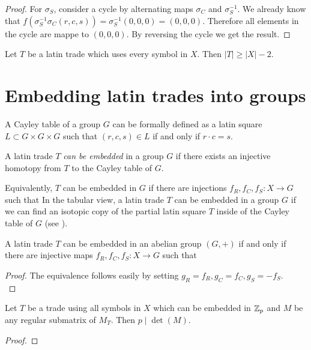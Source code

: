 \begin{proof}
For $\sigma_S$, consider a cycle by alternating maps $\sigma_C$ and $\sigma_S^{-1}$. We already know that $f(\sigma_S^{-1}\sigma_C(r,c,s)) = \sigma_S^{-1}(0,0,0) = (0,0,0)$. Therefore all elements in the cycle are mappe to $(0,0,0)$. By reversing the cycle we get the result.

\end{proof}

\begin{cor}
Let $T$ be a latin trade which uses every symbol in $X$. Then $|T| \geq |X|-2$.
\end{cor}%


\section{Embedding latin trades into groups}

A Cayley table of a group $G$ can be formally defined as a latin square $L \subset G \times G \times G$ such that $(r,c,s) \in L$ if and only if $r \cdot c = s$.

\begin{defn}
A latin trade $T$ \emph{can be embedded} in a group $G$ if there exists an injective homotopy from $T$ to the Cayley table of $G$.
\end{defn}

Equivalently, $T$ can be embedded in $G$ if there are injections $f_R,f_C,f_S : X \rightarrow G$ such that
In the tabular view, a latin trade $T$ can be embedded in a group $G$ if we can find an isotopic copy of the partial latin square $T$ inside of the Cayley table of $G$ (see ).

\begin{lem}
\label{lem:abelian-embedding}
A latin trade $T$ can be embedded in an abelian group $(G,+)$ if and only if there are injective maps $f_R,f_C,f_S : X \rightarrow G$ such that
\end{lem}
\begin{proof}
The equivalence follows easily by setting $g_R = f_R, g_C = f_C, g_S = -f_S$. \\
\end{proof}

\begin{lem}
Let $T$ be a trade using all symbols in $X$ which can be embedded in $\mathbb Z_p$ and $M$ be any regular submatrix of $M_T$. Then $p \mid \det(M)$.
\end{lem}
\begin{proof}
\end{proof}

